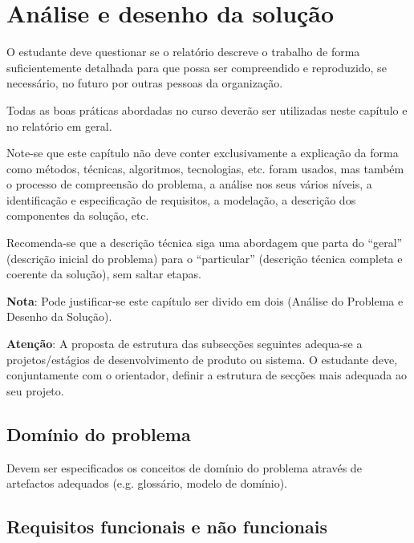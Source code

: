 \chapter{Análise e desenho da solução}
\label{cap:analise_desenho}

O estudante deve questionar se o relatório descreve o trabalho de forma suficientemente detalhada para que possa ser compreendido e reproduzido, se necessário, no futuro por outras pessoas da organização. 

Todas as boas práticas abordadas no curso deverão ser utilizadas neste capítulo e no relatório em geral. 

Note-se que este capítulo não deve conter exclusivamente a explicação da forma como métodos, técnicas, algoritmos, tecnologias, etc. foram usados, mas também o processo de compreensão do problema, a análise nos seus vários níveis, a identificação e especificação de requisitos, a modelação, a descrição dos componentes da solução, etc. 

Recomenda-se que a descrição técnica siga uma abordagem que parta do “geral” (descrição inicial do problema) para o “particular” (descrição técnica completa e coerente da solução), sem saltar etapas.


\textbf{Nota}: Pode justificar-se este capítulo ser divido em dois (Análise do Problema e Desenho da Solução).

\textbf{Atenção}: A proposta de estrutura das subsecções seguintes adequa-se a projetos/estágios de desenvolvimento de produto ou sistema. O estudante deve, conjuntamente com o orientador, definir a estrutura de secções mais adequada ao seu projeto.



\section{Domínio do problema}
\label{sec:domínio_problema}

Devem ser especificados os conceitos de domínio do problema através de artefactos adequados (e.g. glossário, modelo de domínio).



\section{Requisitos funcionais e não funcionais} 
\label{sec:requisitos}

